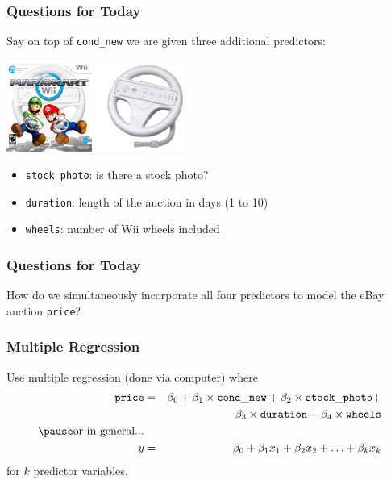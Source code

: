 \documentclass[handout]{beamer}
\newcommand{\blue}[1]{\textcolor{blue2}{#1}}
\begin{document}
\begin{frame}[fragile]
\frametitle{Questions for Today}


Say on top of {\tt cond\_new} we are given three additional predictors:
\begin{center}
\includegraphics[height=3cm]{figure/mario_kart_action.png}
\includegraphics[height=3cm]{figure/wheel.png}
\end{center}
\pause

\begin{itemize}
\item {\tt stock\_photo}: is there a stock photo?
\item {\tt duration}: length of the auction in days (1 to 10)
\item {\tt wheels}: number of Wii wheels included
\end{itemize}


\end{frame}


\begin{frame}[fragile]
\frametitle{Questions for Today}

How do we simultaneously incorporate all four predictors to model the eBay auction {\tt price}?

\end{frame}


\begin{frame}[fragile]
\frametitle{Multiple Regression}
%
%
Use \blue{multiple regression} (done via computer) where
\begin{eqnarray*}
{\tt price} &=& \beta_0 + \beta_1 \times {\tt cond\_new} + \beta_2 \times {\tt stock\_photo} + \\ 
&&\beta_3 \times {\tt duration} + \beta_4 \times {\tt wheels}\\
\pause
\mbox{or in general...} &&\\
y &=& \beta_0 + \beta_1 x_1 + \beta_2 x_2 + \ldots + \beta_k x_k
\end{eqnarray*}
for $k$ predictor variables.
\end{frame}
\end{document}

